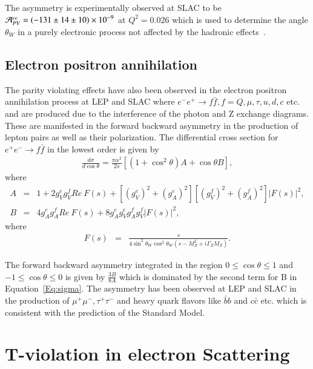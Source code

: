 The asymmetry is experimentally observed at SLAC to be
${\cal A}_{PV}^{ee}= (-131\pm14\pm10)\times{10}^{-9}$ at $Q^2=0.026$
which is used to determine the angle $\theta_W$ in a purely electronic process not affected by the hadronic effects~\cite{Anthony:2005pm}. 

\subsection{Electron positron annihilation}\label{epan}

The parity violating effects have also been observed in the electron positron annihilation process at  LEP and SLAC where $e^-e^+\rightarrow f\bar{f}, f=Q,\mu,\tau,u,d,c$ etc. and  are produced due to the interference of the photon and Z exchange diagrams. These are manifested in the forward backward asymmetry in the production of lepton pairs as well as their polarization. The differential cross section for $e^+e^-\rightarrow f\bar{f}$ in the lowest order is given by~\cite{Aitchison:2004cs}
\begin{eqnarray}\label{Eq:sigma}
 \frac{d \sigma}{d \cos\theta}=\frac{\pi \alpha^{2}}{2s}\left[ (1+ \cos^2 \theta )A + \cos\theta  B\right], 
\end{eqnarray}
where
\begin{eqnarray}
 A&=& 1+2g_{V}^{e}g_{V}^{f}Re~F(s)+[(g_{V}^{e})^2+(g_{A}^{e})^2][(g_{V}^{f})^2+(g_{A}^{f})^2]|F(s)|^2 ,\nonumber \\
 B&=&4g_{A}^{e}g_{A}^{f} Re~F(s)+ 8g_{A}^{e}g_{V}^{e}g_{A}^{f}g_{V}^{f}|F(s)|^2,
 \end{eqnarray}
where
\begin{eqnarray}
F(s)&=&\frac{s}{4\sin^2\theta_{W}\cos^2\theta_{W}(s-M_{Z}^2+i\Gamma_{Z}M_{Z})}.
\end{eqnarray}

 The forward backward asymmetry integrated in the region $0\leq \cos\theta\leq 1$   and $-1\leq\cos\theta\leq 0$ is given by $\frac{3B}{8A}$ which is dominated by the second term for B in Equation~\ref{Eq:sigma}. The asymmetry has been observed at LEP and SLAC in the production of $\mu^+\mu^-,\tau^+\tau^-$ and heavy quark flavors like $\bar{b}b$ and $c\bar{c}$ etc. which is consistent with the prediction of the Standard Model. 
 
\section{T-violation in electron Scattering}

